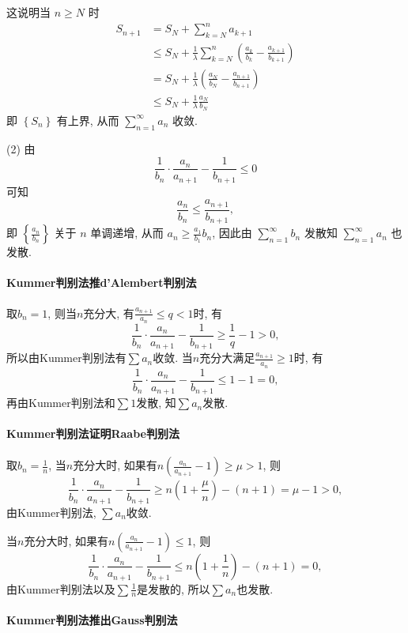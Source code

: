 这说明当 $n\geqslant N$ 时 
\[
\begin{aligned}S_{n+1} & =S_{N}+\sum_{k=N}^{n}a_{k+1}\\
	& \leqslant S_{N}+\frac{1}{\lambda}\sum_{k=N}^{n}\left(\frac{a_{k}}{b_{k}}-\frac{a_{k+1}}{b_{k+1}}\right)\\
	& =S_{N}+\frac{1}{\lambda}\left(\frac{a_{N}}{b_{N}}-\frac{a_{n+1}}{b_{n+1}}\right)\\
	& \leqslant S_{N}+\frac{1}{\lambda}\frac{a_{N}}{b_{N}}
\end{aligned}
\]
即 $\left\{ S_{n}\right\} $ 有上界, 从而 $\sum_{n=1}^{\infty}a_{n}$ 收敛. 

(2) 由 
\[
\frac{1}{b_{n}}\cdot\frac{a_{n}}{a_{n+1}}-\frac{1}{b_{n+1}}\leqslant0
\]
可知 
\[
\frac{a_{n}}{b_{n}}\leqslant\frac{a_{n+1}}{b_{n+1}},
\]
即 $\left\{ \frac{a_{n}}{b_{n}}\right\} $ 关于 $n$ 单调递增, 从而 $a_{n}\geqslant\frac{a_{1}}{b_{1}}b_{n}$,
因此由 $\sum_{n=1}^{\infty}b_{n}$ 发散知 $\sum_{n=1}^{\infty}a_{n}$ 也发散.

\paragraph{Kummer判别法推d'Alembert判别法}

取$b_{n}=1$, 则当$n$充分大, 有$\frac{a_{n+1}}{a_{n}}\le q<1$时, 有
\[
\frac{1}{b_{n}}\cdot\frac{a_{n}}{a_{n+1}}-\frac{1}{b_{n+1}}\ge\frac{1}{q}-1>0,
\]
所以由Kummer判别法有$\sum a_{n}$收敛. 当$n$充分大满足$\frac{a_{n+1}}{a_{n}}\ge1$时,
有
\[
\frac{1}{b_{n}}\cdot\frac{a_{n}}{a_{n+1}}-\frac{1}{b_{n+1}}\le1-1=0,
\]
再由Kummer判别法和$\sum1$发散, 知$\sum a_{n}$发散.

\paragraph{Kummer判别法证明Raabe判别法}

取$b_{n}=\frac{1}{n}$, 当$n$充分大时, 如果有$n\left(\frac{a_{n}}{a_{n+1}}-1\right)\ge\mu>1$,
则
\[
\frac{1}{b_{n}}\cdot\frac{a_{n}}{a_{n+1}}-\frac{1}{b_{n+1}}\ge n\left(1+\frac{\mu}{n}\right)-(n+1)=\mu-1>0,
\]
由Kummer判别法, $\sum a_{n}$收敛.

当$n$充分大时, 如果有$n\left(\frac{a_{n}}{a_{n+1}}-1\right)\le1$, 则
\[
\frac{1}{b_{n}}\cdot\frac{a_{n}}{a_{n+1}}-\frac{1}{b_{n+1}}\le n\left(1+\frac{1}{n}\right)-(n+1)=0,
\]
由Kummer判别法以及$\sum\frac{1}{n}$是发散的, 所以$\sum a_{n}$也发散.

\paragraph{Kummer判别法推出Gauss判别法}

